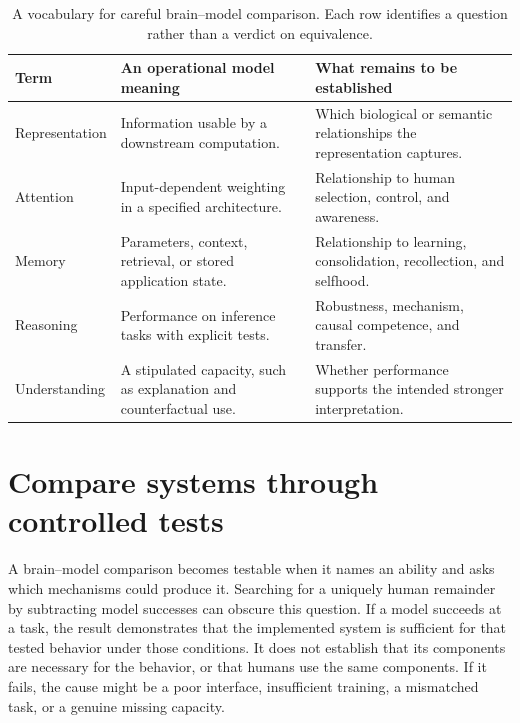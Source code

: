 \documentclass[11pt,a4paper]{article}
\begin{document}
\begin{table}[htbp]\centering\small
\caption{A vocabulary for careful brain--model comparison. Each row identifies a question rather than a verdict on equivalence.}
\begin{tabularx}{\linewidth}{p{23mm}XX}\toprule
Term & An operational model meaning & What remains to be established \\\midrule
Representation & Information usable by a downstream computation. & Which biological or semantic relationships the representation captures.\\
Attention & Input-dependent weighting in a specified architecture. & Relationship to human selection, control, and awareness.\\
Memory & Parameters, context, retrieval, or stored application state. & Relationship to learning, consolidation, recollection, and selfhood.\\
Reasoning & Performance on inference tasks with explicit tests. & Robustness, mechanism, causal competence, and transfer.\\
Understanding & A stipulated capacity, such as explanation and counterfactual use. & Whether performance supports the intended stronger interpretation.\\\bottomrule
\end{tabularx}\label{tab:vocabulary}
\end{table}


\section{Compare systems through controlled tests}\label{sec:comparison}
A brain--model comparison becomes testable when it names an ability and asks which mechanisms could produce it. Searching for a uniquely human remainder by subtracting model successes can obscure this question. If a model succeeds at a task, the result demonstrates that the implemented system is sufficient for that tested behavior under those conditions. It does not establish that its components are necessary for the behavior, or that humans use the same components. If it fails, the cause might be a poor interface, insufficient training, a mismatched task, or a genuine missing capacity.
\end{document}
